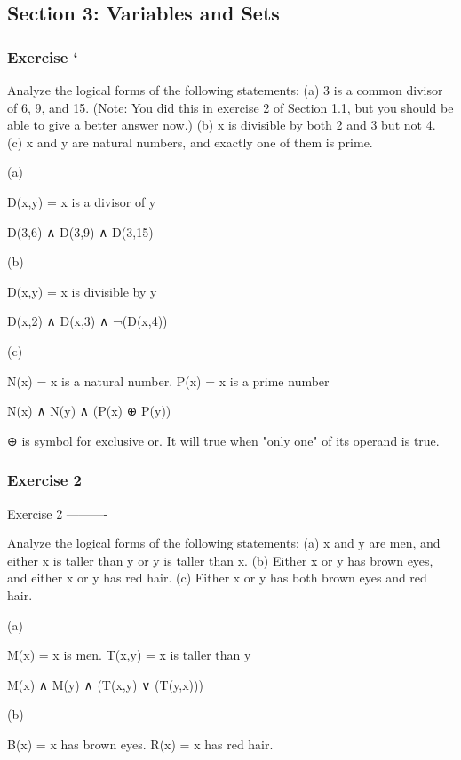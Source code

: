 \subsection{Section 3: Variables and Sets}

\subsubsection{Exercise `}

    Analyze the logical forms of the following statements:
    (a) 3 is a common divisor of 6, 9, and 15. (Note: You did this in exercise
    2 of Section 1.1, but you should be able to give a better answer now.)
    (b) x is divisible by both 2 and 3 but not 4.
    (c) x and y are natural numbers, and exactly one of them is prime.

(a)

D(x,y) = x is a divisor of y

    D(3,6) ∧ D(3,9) ∧ D(3,15)

(b)

D(x,y) = x is divisible by y

    D(x,2) ∧ D(x,3) ∧ ¬(D(x,4))

(c)

N(x) = x is a natural number.
P(x) = x is a prime number

    N(x) ∧ N(y) ∧ (P(x) ⊕ P(y))
    
    ⊕ is symbol for exclusive or. It will true when "only one" of its operand is true.

\subsubsection{Exercise 2}

Exercise 2
----------

    Analyze the logical forms of the following statements:
    (a) x and y are men, and either x is taller than y or y is taller than x.
    (b) Either x or y has brown eyes, and either x or y has red hair.
    (c) Either x or y has both brown eyes and red hair.

(a)

M(x) = x is men.
T(x,y) = x is taller than y

    M(x) ∧ M(y) ∧ (T(x,y) ∨ (T(y,x)))

(b)

B(x) = x has brown eyes.
R(x) = x has red hair.

